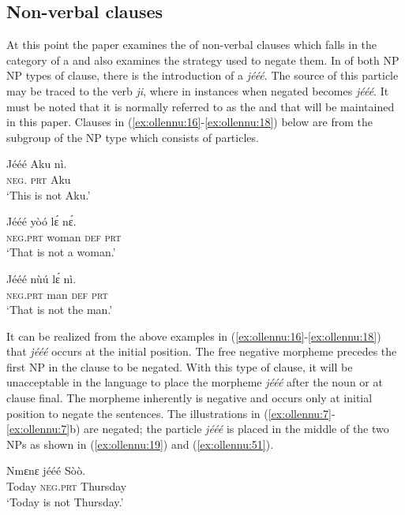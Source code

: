 \documentclass[output=paper
,newtxmath
,modfonts
,nonflat]{langsci/langscibook}
\begin{document}
\subsection{\label{sec:ollennu:2.1} Non-verbal clauses}

At this point the paper examines the  of non-verbal clauses which falls in the category of a  and also examines the strategy used to negate them. In  of both NP NP types of clause, there is the introduction of a  \textit{j\'e\'e\'e}. The source of this particle may be traced to the  verb \textit{ji}, where in instances when negated becomes \textit{j\'e\'e\'e}. It must be noted that it is normally referred to as the  and that will be maintained in this paper. Clauses in (\ref{ex:ollennu:16}-\ref{ex:ollennu:18}) below are from the subgroup of the NP type which consists of particles.

\ea \label{ex:ollennu:16}
\gll J\'e\'e\'e Aku n\`i.\\
\textsc{neg}. \textsc{prt} Aku\\
\glt `This is not Aku.'
\z

\ea \label{ex:ollennu:17}
\gll J\'e\'e\'e y\`o\'o l\'ɛ n\'ɛ.\\
\textsc{neg}.\textsc{prt} woman \textsc{def} \textsc{prt}\\
\glt `That is not a woman.'
\z

\ea \label{ex:ollennu:18}
\gll J\'e\'e\'e n\`u\'u l\'ɛ n\`i.\\
\textsc{neg}.\textsc{prt} man \textsc{def} \textsc{prt}\\
\glt ‘That is not the man.’
\z

It can be realized from the above examples in (\ref{ex:ollennu:16}-\ref{ex:ollennu:18}) that \textit{j\'e\'e\'e} occurs at the initial position. The free negative morpheme precedes the first NP in the clause to be negated. With this type of clause, it will be unacceptable in the  language to place the morpheme \textit{j\'e\'e\'e} after the noun or at clause final. The morpheme inherently is negative and occurs only at initial position to negate the sentences. The illustrations in  (\ref{ex:ollennu:7}-\ref{ex:ollennu:7}b) are negated; the particle \textit{j\'e\'e\'e} is placed in the middle of the two NPs as shown in (\ref{ex:ollennu:19}) and (\ref{ex:ollennu:51}).

\ea \label{ex:ollennu:19}
\gll Nmɛnɛ j\'e\'e\'e S\`o\`o.\\
Today \textsc{neg}.\textsc{prt} Thursday\\
\glt `Today is not Thursday.'
\z
\end{document}
